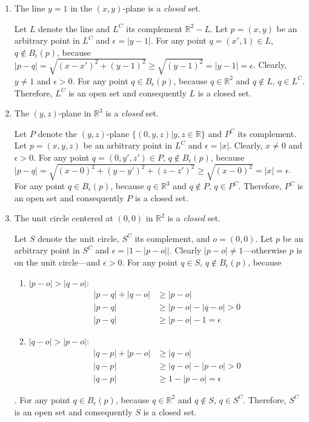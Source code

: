 \documentclass{homework}
\begin{document}
\begin{problem}{5}
\begin{enumerate}
\item The line $y = 1$ in the $(x, y)$-plane is a \emph{closed} set.

Let $L$ denote the line and $L^C$ its complement $\mathbb{R}^2 - L$. Let $p = (x, y)$ be an arbitrary point in $L^C$ and $\epsilon = |y - 1|$. For any point $q = (x', 1) \in L$, $q \notin B_{\epsilon}(p)$, because $|p - q| = \sqrt{(x - x')^2 + (y - 1)^2} \geq \sqrt{(y - 1)^2} = |y - 1| = \epsilon$. Clearly, $y \neq 1$ and $\epsilon > 0$. For any point $q \in B_{\epsilon}(p)$, because $q \in \mathbb{R}^2$ and $q \notin L$, $q \in L^C$. Therefore, $L^C$ is an open set and consequently $L$ is a closed set. \QED

\item The $(y, z)$-plane in $\mathbb{R}^3$ is a \emph{closed} set.

Let $P$ denote the $(y, z)$-plane $\{(0, y, z) | y, z \in \mathbb{R}\}$ and $P^C$ its complement. Let $p = (x, y, z)$ be an arbitrary point in $L^C$ and $\epsilon = |x|$. Clearly, $x \neq 0$ and $\epsilon > 0$. For any point $q = (0, y', z') \in P$, $q \notin B_{\epsilon}(p)$, because $|p - q| = \sqrt{(x - 0)^2 + (y - y')^2 + (z - z')^2} \geq \sqrt{(x - 0)^2} = |x| = \epsilon$. For any point $q \in B_{\epsilon}(p)$, because $q \in \mathbb{R}^3$ and $q \notin P$, $q \in P^C$. Therefore, $P^C$ is an open set and consequently $P$ is a closed set. \QED

\item The unit circle centered at $(0, 0)$ in $\mathbb{R}^2$ is a \emph{closed} set.

Let $S$ denote the unit circle, $S^C$ its complement, and $o = (0, 0)$. Let $p$ be an arbitrary point in $S^C$ and $\epsilon = |1 - |p - o||$. Clearly $|p - o| \neq 1$---otherwise $p$ is on the unit circle---and $\epsilon > 0$. For any point $q \in S$, $q \notin B_{\epsilon}(p)$, because
\begin{enumerate}
\item $|p - o| > |q - o|$:
\begin{align*}
  |p - q| + |q - o| & \geq |p - o| \\
  |p - q| & \geq |p - o| - |q - o| > 0 \\
  |p - q| & \geq |p - o| - 1 = \epsilon
\end{align*}

\item $|q - o| > |p - o|$:
\begin{align*}
  |q - p| + |p - o| & \geq |q - o| \\
  |q - p| & \geq |q - o| - |p - o| > 0 \\
  |q - p| & \geq 1 - |p - o| = \epsilon
\end{align*}
\end{enumerate}
. For any point $q \in B_{\epsilon}(p)$, because $q \in \mathbb{R}^2$ and $q \notin S$, $q \in S^C$. Therefore, $S^C$ is an open set and consequently $S$ is a closed set. \QED


\end{enumerate}
\end{problem}
\end{document}
